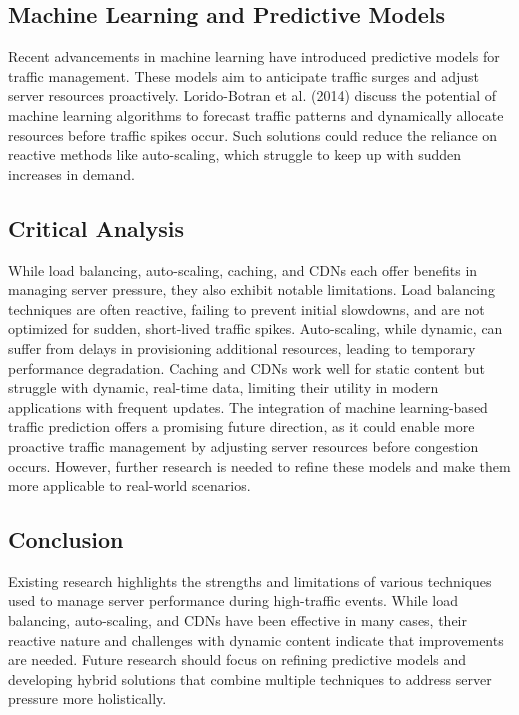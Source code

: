 \documentclass[a4paper, 12pt]{article}
\begin{document}
\subsection{Machine Learning and Predictive Models}

Recent advancements in machine learning have introduced predictive models for traffic management. These models aim to anticipate traffic surges and adjust server resources proactively. Lorido-Botran et al. (2014) discuss the potential of machine learning algorithms to forecast traffic patterns and dynamically allocate resources before traffic spikes occur. Such solutions could reduce the reliance on reactive methods like auto-scaling, which struggle to keep up with sudden increases in demand.

\subsection{Critical Analysis}

While load balancing, auto-scaling, caching, and CDNs each offer benefits in managing server pressure, they also exhibit notable limitations. Load balancing techniques are often reactive, failing to prevent initial slowdowns, and are not optimized for sudden, short-lived traffic spikes. Auto-scaling, while dynamic, can suffer from delays in provisioning additional resources, leading to temporary performance degradation. Caching and CDNs work well for static content but struggle with dynamic, real-time data, limiting their utility in modern applications with frequent updates.
The integration of machine learning-based traffic prediction offers a promising future direction, as it could enable more proactive traffic management by adjusting server resources before congestion occurs. However, further research is needed to refine these models and make them more applicable to real-world scenarios.

\subsection{Conclusion}

Existing research highlights the strengths and limitations of various techniques used to manage server performance during high-traffic events. While load balancing, auto-scaling, and CDNs have been effective in many cases, their reactive nature and challenges with dynamic content indicate that improvements are needed. Future research should focus on refining predictive models and developing hybrid solutions that combine multiple techniques to address server pressure more holistically.
\end{document}
